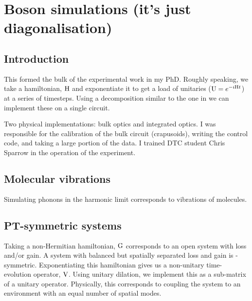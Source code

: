 \chapter{Boson simulations (it's just diagonalisation)}
\label{ch:Simulations}

\section{Introduction}
\label{sec:SimIntro}
This formed the bulk of the experimental work in my PhD. Roughly speaking, we
take a hamiltonian, \(\mathrm{H}\) and exponentiate it to get a load of unitaries
(\(\mathrm{U}=e^{-i\mathrm{H}t}\)) at a series of timesteps. Using a decomposition
similar to the one in \cite{reck94} we can implement these on a single
circuit.

Two physical implementations: bulk optics and integrated optics. I was
responsible for the calibration of the bulk circuit (crapusoids), writing the
control code, and taking a large portion of the data. I trained DTC student
Chris Sparrow in the operation of the experiment.

\section{Molecular vibrations}
\label{sec:Molecules}
Simulating phonons in the harmonic limit corresponds to vibrations of molecules.

\section{PT-symmetric systems}
\label{sec:PT}
Taking a non-Hermitian hamiltonian, \(\mathrm{G}\) corresponds to an open system
with loss and/or gain. A system with balanced but spatially separated loss and
gain is \pt-symmetric. Exponentiating this hamiltonian gives us a non-unitary
time-evolution operator, \(\mathrm{V}\). Using unitary dilation, we implement this
as a sub-matrix of a unitary operator. Physically, this corresponds to coupling
the system to an environment with an equal number of spatial modes.
